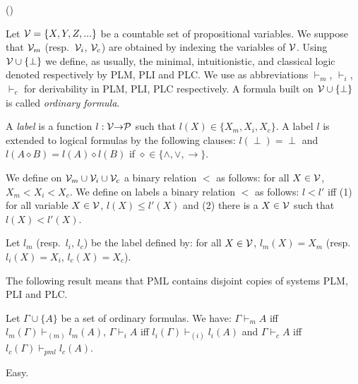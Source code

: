 \documentclass{jancl}
\begin{document}
\begin{definition}
\begin{janclenum}{(\arabic}{)}
\item Let ${\cal V} = \{ X , Y , Z , ... \}$ be a countable set of
propositional variables. We suppose that ${\cal V}_m$ (resp.\
${\cal V}_i$, ${\cal V}_c$) are obtained by indexing the variables
of ${\cal V}$. Using ${\cal V} \cup \{\perp\}$ we define, as
usually, the minimal, intuitionistic, and classical logic denoted
respectively by {\rm PLM}, {\rm PLI} and {\rm PLC}. We use as
abbreviations ${\vdash}_m$, ${\vdash}_i$, ${\vdash}_c$ for derivability in {\rm
PLM}, {\rm PLI}, {\rm PLC} respectively. A formula built on ${\cal
V} \cup \{ \perp \}$ is called \emph{ordinary formula}.

\item A \emph{label} is a function $l : {\cal V} {\rightarrow} {\cal P}$ such
that $l(X) \in \{X_m , X_i , X_c \}$. A label $l$ is extended to
logical formulas by the following clauses: $l(\perp) = \perp$ and
$l(A \diamond B) = l(A) \diamond l(B)$ if $\diamond \in \{ {\wedge} ,
{\vee} , {\rightarrow} \}$.

\item We define on ${\cal V}_m \cup {\cal V}_i \cup {\cal V}_c$ a
binary relation $<$ as follows: for all $X \in {\cal V}$, $X_m <
X_i <X_c$. We define on labels a binary relation $<$ as follows:
$l < l'$ iff (1) for all variable $X \in {\cal V}$, $l(X) \leq
l'(X)$ and (2) there is a $X \in {\cal V}$ such that $l(X) <
l'(X)$.

\item Let $l_m$ (resp.\ $l_i$, $l_c$) be the label defined by: for
all $X \in {\cal V}$, $l_m(X) = X_m$ (resp.\ $l_i(X) = X_i$,
$l_c(X) = X_c$).
\end{janclenum}
\end{definition}

The following result means that PML contains disjoint copies of
systems PLM, PLI and PLC.
\begin{theorem}\label{dec1}
Let ${\Gamma} \cup \{ A \}$ be a set of ordinary
formulas. We have: ${\Gamma} {\vdash}_m A$ iff $l_m({\Gamma}) {\vdash}_{(m)} l_m(A)$,
${\Gamma} {\vdash}_i A$ iff $l_i({\Gamma}) {\vdash}_{(i)} l_i(A)$
and ${\Gamma} {\vdash}_c A$ iff $l_c({\Gamma}) {\vdash}_{pml} l_c(A)$.
\end{theorem}

\begin{proof*}
Easy.
\end{proof*}
\end{document}

